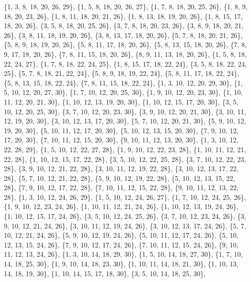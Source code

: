 \documentclass[11pt,a4paper]{article}
\begin{document}
{\{1, 3, 8, 18, 20, 26, 29\}, \{1, 5, 8, 18, 20, 26, 27\}, \{1, 7, 8, 18, 20, 25, 26\}, \{1, 8, 9, 18, 20, 23, 26\}, \{1, 8, 11, 18, 20, 21, 26\},
\{1, 8, 13, 18, 19, 20, 26\}, \{1, 8, 15, 17, 18, 20, 26\}, \{3, 5, 8, 18, 20, 25, 26\}, \{3, 7, 8, 18, 20, 23, 26\}, \{3, 8, 9, 18, 20, 21, 26\},
\{3, 8, 11, 18, 19, 20, 26\}, \{3, 8, 13, 17, 18, 20, 26\}, \{5, 7, 8, 18, 20, 21, 26\}, \{5, 8, 9, 18, 19, 20, 26\}, \{5, 8, 11, 17, 18, 20, 26\},
\{5, 8, 13, 15, 18, 20, 26\}, \{7, 8, 9, 17, 18, 20, 26\}, \{7, 8, 11, 15, 18, 20, 26\}, \{8, 9, 11, 13, 18, 20, 26\}, \{1, 5, 8, 18, 22, 24, 27\},
\{1, 7, 8, 18, 22, 24, 25\}, \{1, 8, 15, 17, 18, 22, 24\}, \{3, 5, 8, 18, 22, 24, 25\}, \{5, 7, 8, 18, 21, 22, 24\}, \{5, 8, 9, 18, 19, 22, 24\},
\{5, 8, 11, 17, 18, 22, 24\}, \{5, 8, 13, 15, 18, 22, 24\}, \{7, 8, 11, 15, 18, 22, 24\}, \{1, 3, 10, 12, 20, 29, 30\}, \{1, 5, 10, 12, 20, 27, 30\},
\{1, 7, 10, 12, 20, 25, 30\}, \{1, 9, 10, 12, 20, 23, 30\}, \{1, 10, 11, 12, 20, 21, 30\}, \{1, 10, 12, 13, 19, 20, 30\}, \{1, 10, 12, 15, 17, 20, 30\},
\{3, 5, 10, 12, 20, 25, 30\}, \{3, 7, 10, 12, 20, 23, 30\}, \{3, 9, 10, 12, 20, 21, 30\}, \{3, 10, 11, 12, 19, 20, 30\}, \{3, 10, 12, 13, 17, 20, 30\},
\{5, 7, 10, 12, 20, 21, 30\}, \{5, 9, 10, 12, 19, 20, 30\}, \{5, 10, 11, 12, 17, 20, 30\}, \{5, 10, 12, 13, 15, 20, 30\}, \{7, 9, 10, 12, 17, 20, 30\},
\{7, 10, 11, 12, 15, 20, 30\}, \{9, 10, 11, 12, 13, 20, 30\}, \{1, 3, 10, 12, 22, 28, 29\}, \{1, 5, 10, 12, 22, 27, 28\}, \{1, 9, 10, 12, 22, 23, 28\},
\{1, 10, 11, 12, 21, 22, 28\}, \{1, 10, 12, 15, 17, 22, 28\}, \{3, 5, 10, 12, 22, 25, 28\}, \{3, 7, 10, 12, 22, 23, 28\}, \{3, 9, 10, 12, 21, 22, 28\},
\{3, 10, 11, 12, 19, 22, 28\}, \{3, 10, 12, 13, 17, 22, 28\}, \{5, 7, 10, 12, 21, 22, 28\}, \{5, 9, 10, 12, 19, 22, 28\}, \{5, 10, 12, 13, 15, 22, 28\},
\{7, 9, 10, 12, 17, 22, 28\}, \{7, 10, 11, 12, 15, 22, 28\}, \{9, 10, 11, 12, 13, 22, 28\}, \{1, 3, 10, 12, 24, 26, 29\}, \{1, 5, 10, 12, 24, 26, 27\},
\{1, 7, 10, 12, 24, 25, 26\}, \{1, 9, 10, 12, 23, 24, 26\}, \{1, 10, 11, 12, 21, 24, 26\}, \{1, 10, 12, 13, 19, 24, 26\}, \{1, 10, 12, 15, 17, 24, 26\},
\{3, 5, 10, 12, 24, 25, 26\}, \{3, 7, 10, 12, 23, 24, 26\}, \{3, 9, 10, 12, 21, 24, 26\}, \{3, 10, 11, 12, 19, 24, 26\}, \{3, 10, 12, 13, 17, 24, 26\},
\{5, 7, 10, 12, 21, 24, 26\}, \{5, 9, 10, 12, 19, 24, 26\}, \{5, 10, 11, 12, 17, 24, 26\}, \{5, 10, 12, 13, 15, 24, 26\}, \{7, 9, 10, 12, 17, 24, 26\},
\{7, 10, 11, 12, 15, 24, 26\}, \{9, 10, 11, 12, 13, 24, 26\}, \{1, 3, 10, 14, 18, 29, 30\}, \{1, 5, 10, 14, 18, 27, 30\}, \{1, 7, 10, 14, 18, 25, 30\},
\{1, 9, 10, 14, 18, 23, 30\}, \{1, 10, 11, 14, 18, 21, 30\}, \{1, 10, 13, 14, 18, 19, 30\}, \{1, 10, 14, 15, 17, 18, 30\}, \{3, 5, 10, 14, 18, 25, 30\},
}
\end{document}
